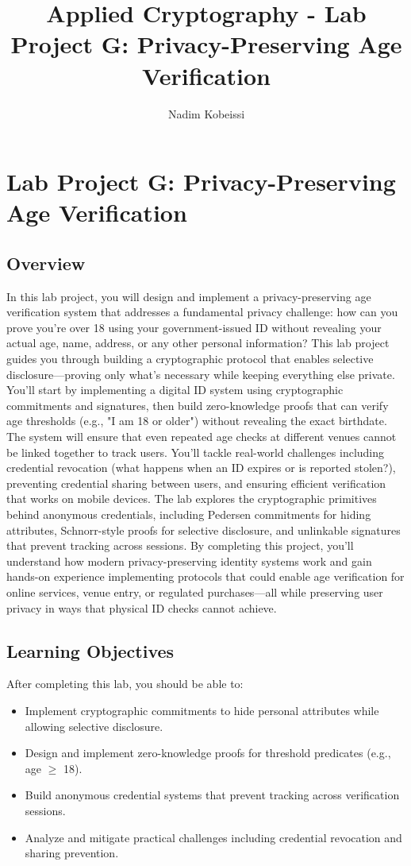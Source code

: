 \documentclass[10pt,a4paper,american]{exam}
\title{Applied Cryptography - Lab Project G: Privacy-Preserving Age Verification}
\author{Nadim Kobeissi}
\begin{document}
\classhandoutheader
\section*{Lab Project G: Privacy-Preserving Age Verification}

\subsection*{Overview}
In this lab project, you will design and implement a privacy-preserving age verification system that addresses a fundamental privacy challenge: how can you prove you're over 18 using your government-issued ID without revealing your actual age, name, address, or any other personal information? This lab project guides you through building a cryptographic protocol that enables selective disclosure—proving only what's necessary while keeping everything else private. You'll start by implementing a digital ID system using cryptographic commitments and signatures, then build zero-knowledge proofs that can verify age thresholds (e.g., "I am 18 or older") without revealing the exact birthdate. The system will ensure that even repeated age checks at different venues cannot be linked together to track users. You'll tackle real-world challenges including credential revocation (what happens when an ID expires or is reported stolen?), preventing credential sharing between users, and ensuring efficient verification that works on mobile devices. The lab explores the cryptographic primitives behind anonymous credentials, including Pedersen commitments for hiding attributes, Schnorr-style proofs for selective disclosure, and unlinkable signatures that prevent tracking across sessions. By completing this project, you'll understand how modern privacy-preserving identity systems work and gain hands-on experience implementing protocols that could enable age verification for online services, venue entry, or regulated purchases—all while preserving user privacy in ways that physical ID checks cannot achieve.

\subsection*{Learning Objectives}
After completing this lab, you should be able to:
\begin{itemize}
	\item Implement cryptographic commitments to hide personal attributes while allowing selective disclosure.
	\item Design and implement zero-knowledge proofs for threshold predicates (e.g., age $\geq$ 18).
	\item Build anonymous credential systems that prevent tracking across verification sessions.
	\item Analyze and mitigate practical challenges including credential revocation and sharing prevention.
\end{itemize}
\end{document}
